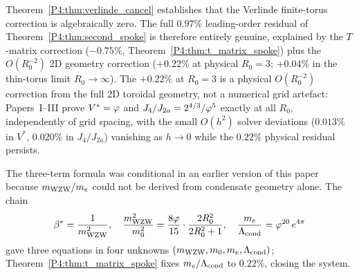 \begin{remark}
\label{P4:rem:revised_decomp}
Theorem~\ref{P4:thm:verlinde_cancel} establishes that the Verlinde
finite-torus correction is algebraically zero. The full $0.97\%$
leading-order residual of Theorem~\ref{P4:thm:second_spoke} is therefore
entirely genuine, explained by the $T$-matrix correction ($-0.75\%$,
Theorem~\ref{P4:thm:t_matrix_spoke}) plus the $O(R_0^{-2})$ 2D geometry
correction ($+0.22\%$ at physical $R_0=3$; $+0.04\%$ in the thin-torus
limit $R_0\to\infty$). The $+0.22\%$ at $R_0=3$ is a physical
$O(R_0^{-2})$ correction from the full 2D toroidal geometry, not a
numerical grid artefact: Papers~I--III prove $V^*=\varphi$ and
$J_4/J_{2a}=2^{4/3}/\varphi^5$ exactly at all $R_0$, independently of grid
spacing, with the small $O(h^2)$ solver deviations ($0.013\%$ in $V^*$,
$0.020\%$ in $J_4/J_{2a}$) vanishing as $h\to0$ while the $0.22\%$
physical residual persists.
\end{remark}

The three-term formula was conditional in an earlier version of this
paper because $m_{\mathrm{WZW}}/m_e$ could not be derived from condensate geometry
alone. The chain
\begin{equation}
  \beta^{*} = \frac{1}{m_{\mathrm{WZW}}^2},
  \quad
  \frac{m_{\mathrm{WZW}}^2}{m_0^2} = \frac{8\varphi}{15}\cdot\frac{2R_0^2}{2R_0^2+1},
  \quad
  \frac{m_e}{\Lambda_{\mathrm{cond}}} = \varphi^{20}\,e^{4\pi}
  \label{P4:eq:old_chain_3eqs}
\end{equation}
gave three equations in four unknowns $(m_{\mathrm{WZW}},m_0,m_e,\Lambda_{\mathrm{cond}})$;
Theorem~\ref{P4:thm:t_matrix_spoke} fixes $m_e/\Lambda_{\mathrm{cond}}$ to $0.22\%$,
closing the system.

